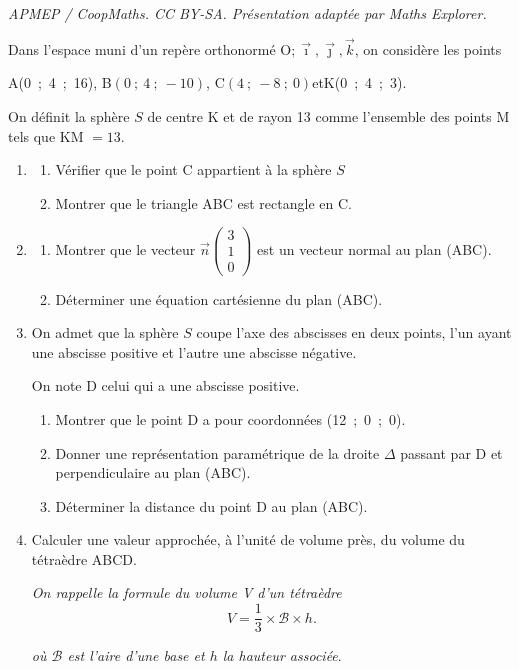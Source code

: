 \documentclass[10pt]{article}
\providecommand{\vect}[1]{\overrightarrow{#1}}
\providecommand{\Oijk}{\(\mathrm{O};\vec{\imath},\vec{\jmath},\vec{k}\)}
\begin{document}
\noindent\textit{APMEP / CoopMaths. CC BY-SA. Présentation adaptée par Maths Explorer.}\par\medskip
\medskip

Dans l'espace muni d'un repère orthonormé \Oijk, on considère les points 
\begin{center}A(0~;~4~;~16), \quad B$(0~;~4~;~- 10)$, \quad C$(4~;~-8~;~0)$\quad et\quad  K(0~;~4~;~3).\end{center}

On définit la sphère $S$ de centre K et de rayon 13 comme l'ensemble des points M tels que KM $= 13$.

\medskip

\begin{enumerate}
\item 
	\begin{enumerate}
		\item Vérifier que le point C appartient à la sphère $S$
		\item Montrer que le triangle ABC est rectangle en C.
	\end{enumerate}
\item 
	\begin{enumerate}
		\item Montrer que le vecteur $\vect{n}\begin{pmatrix}3\\1\\0\end{pmatrix}$ est un vecteur normal au plan (ABC).
		\item Déterminer une équation cartésienne du plan (ABC).
	\end{enumerate}
\item On admet que la sphère $S$ coupe l'axe des abscisses en deux points, l'un ayant une abscisse positive et l'autre une abscisse négative.

On note D celui qui a une abscisse positive.
	\begin{enumerate}
		\item Montrer que le point D a pour coordonnées (12~;~0~;~0).
		\item Donner une représentation paramétrique de la droite $\Delta$ passant par D et perpendiculaire au plan (ABC).
		\item  Déterminer la distance du point D au plan (ABC).
	\end{enumerate}
\item Calculer une valeur approchée, à l'unité de volume près, du volume du tétraèdre ABCD.

\emph{On rappelle la formule du volume V d'un tétraèdre}
\[V = \dfrac13 \times \mathcal{B} \times h.\]

\emph{où $\mathcal{B}$ est l'aire d'une base et $h$ la hauteur associée}.
\end{enumerate}

\bigskip
\end{document}
